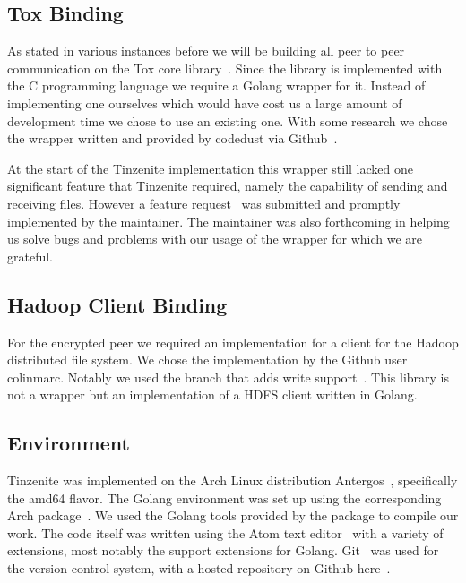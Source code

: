 \subsection{Tox Binding}
\label{sub:Tox Binding}

As stated in various instances before we will be building all peer to peer communication on the Tox core library~\cite{web:site:github:toxcore}.
Since the library is implemented with the C programming language we require a Golang wrapper for it.
Instead of implementing one ourselves which would have cost us a large amount of development time we chose to use an existing one.
With some research we chose the wrapper written and provided by codedust via Github~\cite{web:site:github:gotox}.

At the start of the Tinzenite implementation this wrapper still lacked one significant feature that Tinzenite required, namely the capability of sending and receiving files.
However a feature request~\cite{web:site:github:file_issue} was submitted and promptly implemented by the maintainer.
The maintainer was also forthcoming in helping us solve bugs and problems with our usage of the wrapper for which we are grateful.

\subsection{Hadoop Client Binding}
\label{sub:Hadoop Client Binding}

For the encrypted peer we required an implementation for a client for the Hadoop distributed file system.
We chose the implementation by the Github user colinmarc.
Notably we used the branch that adds write support~\cite{web:site:github:hdfs}.
This library is not a wrapper but an implementation of a HDFS client written in Golang.

\subsection{Environment}
\label{sub:Environment}

Tinzenite was implemented on the Arch Linux distribution Antergos~\cite{web:site:antergos}, specifically the amd64 flavor.
The Golang environment was set up using the corresponding Arch package~\cite{web:site:arch_go}.
We used the Golang tools provided by the package to compile our work.
The code itself was written using the Atom text editor~\cite{web:site:atom} with a variety of extensions, most notably the support extensions for Golang.
Git~\cite{web:site:git} was used for the version control system, with a hosted repository on Github here~\cite{web:site:github:tinzenite}.

